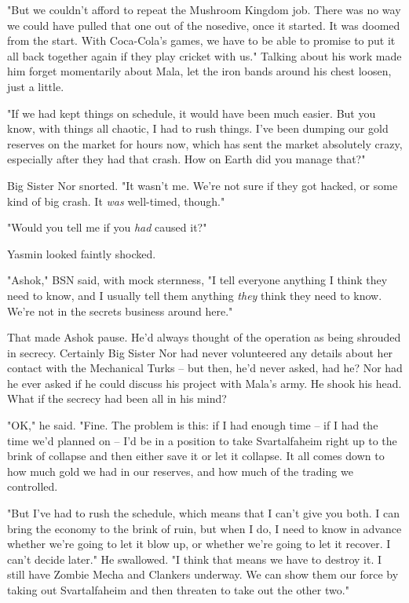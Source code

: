"But we couldn't afford to repeat the Mushroom Kingdom job. There
was no way we could have pulled that one out of the nosedive, once
it started. It was doomed from the start. With Coca-Cola's games,
we have to be able to promise to put it all back together again if
they play cricket with us." Talking about his work made him forget
momentarily about Mala, let the iron bands around his chest loosen,
just a little.

"If we had kept things on schedule, it would have been much easier.
But you know, with things all chaotic, I had to rush things. I've
been dumping our gold reserves on the market for hours now, which
has sent the market absolutely crazy, especially after they had
that crash. How on Earth did you manage that?"

Big Sister Nor snorted. "It wasn't me. We're not sure if they got
hacked, or some kind of big crash. It \emph{was} well-timed,
though."

"Would you tell me if you \emph{had} caused it?"

Yasmin looked faintly shocked.

"Ashok," BSN said, with mock sternness, "I tell everyone anything I
think they need to know, and I usually tell them anything
\emph{they} think they need to know. We're not in the secrets
business around here."

That made Ashok pause. He'd always thought of the operation as
being shrouded in secrecy. Certainly Big Sister Nor had never
volunteered any details about her contact with the Mechanical Turks
-- but then, he'd never asked, had he? Nor had he ever asked if he
could discuss his project with Mala's army. He shook his head. What
if the secrecy had been all in his mind?

"OK," he said. "Fine. The problem is this: if I had enough time --
if I had the time we'd planned on -- I'd be in a position to take
Svartalfaheim right up to the brink of collapse and then either
save it or let it collapse. It all comes down to how much gold we
had in our reserves, and how much of the trading we controlled.

"But I've had to rush the schedule, which means that I can't give
you both. I can bring the economy to the brink of ruin, but when I
do, I need to know in advance whether we're going to let it blow
up, or whether we're going to let it recover. I can't decide
later." He swallowed. "I think that means we have to destroy it. I
still have Zombie Mecha and Clankers underway. We can show them our
force by taking out Svartalfaheim and then threaten to take out the
other two."

